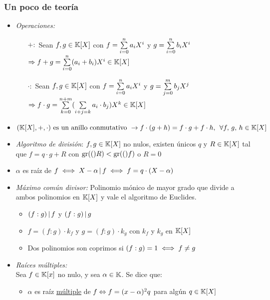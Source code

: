 \newcommand{\polGen}[1]{\sumatoria{i=0}{n} #1_i X^i}
\newcommand{\mult}[1]{\text{mult}(#1)}


\subsubsection*{Un poco de teoría}

\begin{itemize}
	\item \textit{Operaciones: }
	      \begin{itemize}
		      \item[$+:$] Sean $f,g \in \mathbb K[X]$ con $f = \polGen{a}$ y $g = \polGen{b}$\\
		            $\Rightarrow f + g = \sum\limits_{i=0}^{n} (a_i + b_i) X^i \in \mathbb K[X]$
		      \item[$\cdot:$] Sean $f,g \in \mathbb K[X]$ con $f = \polGen{a}$ y $g = \sum\limits_{j=0}^{m} b_j X^j$\\
		            $\Rightarrow f \cdot g = \sum\limits_{k=0}^{n+m} (\sum\limits_{i+j=k}^{} a_i \cdot b_j) X^k \in \mathbb K[X]$
	      \end{itemize}
	\item $(\mathbb K[X],+,\cdot) \text{ es un anillo conmutativo } \to f\cdot(g+h) = f\cdot g + f\cdot h,\, \;\forall f,\,g,\,h \in \mathbb K[X]$

	\item \textit{Algoritmo de división}: $f,g \in \mathbb K[X]$ no nulos, existen únicos $q$ y $R \in \mathbb K[X]$ tal que $f = q\cdot g + R$
	      con $\text{gr}(()R) < \text{gr}(()f)$ o $R = 0$

	\item $\alpha$ es raíz de $f \iff X - \alpha \, | \, f \iff f = q \cdot ( X - \alpha)$

	\item \textit{Máximo común divisor: } Polinomio mónico de mayor grado que divide a ambos polinomios en $\mathbb K[X]$
	      y vale el algoritmo de Euclides.
	      \begin{itemize}
		      \item $(f:g) \, | \, f$ y $(f:g) \, | \, g$

		      \item $f = (f:g)\cdot k_f$ y $g = (f:g)\cdot k_g$ con $k_f$ y $k_g$ en $\mathbb K[X]$

		      \item Dos polinomios son coprimos si $(f:g) = 1 \iff f \neq g$
	      \end{itemize}

	\item \textit{Raíces múltiples: }\\
	      Sea $f \in \mathbb K[x]$ no nulo, y sea $\alpha \in \mathbb K$. Se dice que:
	      \begin{itemize}
		      \item $\alpha$ es raíz \underline{múltiple} de $f \Leftrightarrow f = (x - \alpha)^2 q$ para algún $q \in \mathbb K[X]$


\end{itemize}
\end{itemize}
